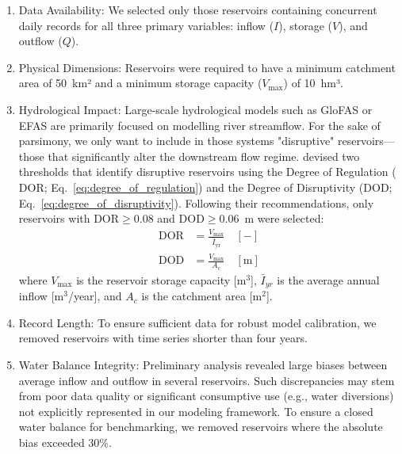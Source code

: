 \documentclass[hess, manuscript]{copernicus}
\begin{document}
\begin{enumerate}
    \item Data Availability: We selected only those reservoirs containing concurrent daily records for all three primary variables: inflow ($I$), storage ($V$), and outflow ($Q$).
    \item Physical Dimensions: Reservoirs were required to have a minimum catchment area of 50~km² and a minimum storage capacity ($V_{\max}$) of 10~hm³.
    \item Hydrological Impact: Large-scale hydrological models such as GloFAS or EFAS are primarily focused on modelling river streamflow. For the sake of parsimony, we only want to include in those systems "disruptive" reservoirs—those that significantly alter the downstream flow regime. \citet{Shrestha2024} devised two thresholds that identify disruptive reservoirs using the Degree of Regulation ($\text{DOR}$; Eq.~\ref{eq:degree_of_regulation}) and the Degree of Disruptivity ($\text{DOD}$; Eq.~\ref{eq:degree_of_disruptivity}). Following their recommendations, only reservoirs with $\text{DOR} \geq 0.08$ and $\text{DOD} \geq 0.06$~m were selected:
    \begin{subequations}
        \label{eq:disruptive_reservoirs}
        \begin{align}
            \text{DOR} &= \frac{V_{\max}}{\bar{I}_{\text{yr}}} \quad [-] \label{eq:degree_of_regulation} \\[1ex]
            \text{DOD} &= \frac{V_{\max}}{A_c} \quad [\text{m}] \label{eq:degree_of_disruptivity}
        \end{align} 
    \end{subequations}
    where $V_{\max}$ is the reservoir storage capacity [m$^3$], $\bar{I}_{yr}$ is the average annual inflow [m$^3$/year], and $A_c$ is the catchment area [m$^2$].
    \item Record Length: To ensure sufficient data for robust model calibration, we removed reservoirs with time series shorter than four years.
    \item Water Balance Integrity: Preliminary analysis revealed large biases between average inflow and outflow in several reservoirs. Such discrepancies may stem from poor data quality or significant consumptive use (e.g., water diversions) not explicitly represented in our modeling framework. To ensure a closed water balance for benchmarking, we removed reservoirs where the absolute bias exceeded 30\%.
\end{enumerate}
\end{document}
